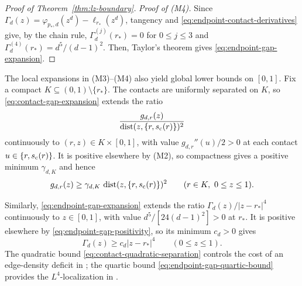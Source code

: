 \begin{proof}[Proof of Theorem~\ref{thm:lz-boundary}]
\emph{Proof of (M4).}
Since $\Gamma_d(z)=\varphi_{p_*,d}(z^d)-\ell_{r_*}(z^d)$,
tangency and \eqref{eq:endpoint-contact-derivatives} give, by the chain rule,
$\Gamma_d^{(j)}(r_*)=0$ for $0\le j\le3$ and
$\Gamma_d^{(4)}(r_*)=d^5/(d-1)^2$.
Then, Taylor's theorem gives \eqref{eq:endpoint-gap-expansion}.
\end{proof}

The local expansions in (M3)--(M4) also yield global lower bounds on $[0,1]$.
Fix a compact $K\subseteq(0,1)\setminus\{r_*\}$.
The contacts are uniformly separated on $K$, so \eqref{eq:contact-gap-expansion}
extends the ratio
\[
  \frac{g_{d,r}(z)}{\dist(z,\{r,\sc(r)\})^2}
\]
continuously to $(r,z) \in K\times[0,1]$, with value $g_{d,r}''(u)/2>0$ at each contact
$u\in\{r,\sc(r)\}$.  It is positive elsewhere by (M2), so compactness gives
a positive minimum $\gamma_{d,K}$ and hence
\begin{equation}\label{eq:contact-quadratic-separation}
  g_{d,r}(z)\ge\gamma_{d,K}\,\dist(z,\{r,\sc(r)\})^2
  \qquad(r\in K,\ 0\le z\le1).
\end{equation}

Similarly, \eqref{eq:endpoint-gap-expansion} extends the ratio
$\Gamma_d(z)/|z-r_*|^4$ continuously to $z\in[0,1]$, with value
$d^5/[24(d-1)^2]>0$ at $r_*$.
It is positive elsewhere by \eqref{eq:endpoint-gap-positivity}, so its
minimum $c_d>0$ gives
\begin{equation}\label{eq:endpoint-gap-quartic-bound}
  \Gamma_d(z)\ge c_d|z-r_*|^4
  \qquad(0\le z\le1).
\end{equation}
The quadratic bound \eqref{eq:contact-quadratic-separation} controls
the cost of an edge-density deficit in ;
the quartic bound \eqref{eq:endpoint-gap-quartic-bound} provides the
$L^4$-localization in .
